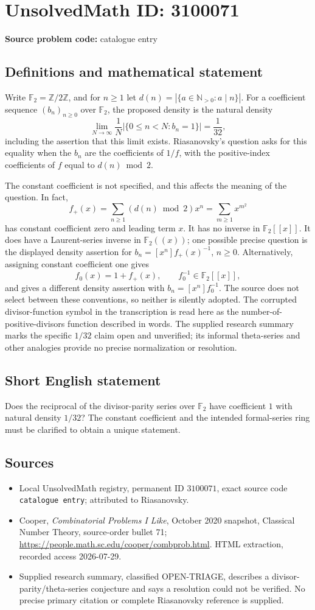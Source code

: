 \documentclass[11pt]{article}
\newcommand{\N}{\mathbb{N}}
\newcommand{\Z}{\mathbb{Z}}
\newcommand{\F}{\mathbb{F}}
\begin{document}
\section*{UnsolvedMath ID: 3100071}
\textbf{Source problem code:} catalogue entry
\subsection{Definitions and mathematical statement}
Write \(\F_2=\Z/2\Z\), and for \(n\ge1\) let \(d(n)=|\{a\in\N_{>0}:a\mid n\}|\). For a coefficient sequence \((b_n)_{n\ge0}\) over \(\F_2\), the proposed density is the natural density
\[
\lim_{N\to\infty}\frac1N|\{0\le n<N:b_n=1\}|=\frac1{32},
\]
including the assertion that this limit exists. Riasanovsky's question asks for this equality when the \(b_n\) are the coefficients of \(1/f\), with the positive-index coefficients of \(f\) equal to \(d(n)\bmod2\).

The constant coefficient is not specified, and this affects the meaning of the question. In fact,
\[
f_+(x)=\sum_{n\ge1}(d(n)\bmod2)x^n=\sum_{m\ge1}x^{m^2}
\]
has constant coefficient zero and leading term \(x\). It has no inverse in \(\F_2[[x]]\). It does have a Laurent-series inverse in \(\F_2((x))\); one possible precise question is the displayed density assertion for \(b_n=[x^n]f_+(x)^{-1}\), \(n\ge0\). Alternatively, assigning constant coefficient one gives
\[
f_0(x)=1+f_+(x),\qquad f_0^{-1}\in\F_2[[x]],
\]
and gives a different density assertion with \(b_n=[x^n]f_0^{-1}\). The source does not select between these conventions, so neither is silently adopted. The corrupted divisor-function symbol in the transcription is read here as the number-of-positive-divisors function described in words. The supplied research summary marks the specific \(1/32\) claim open and unverified; its informal theta-series and other analogies provide no precise normalization or resolution.
\subsection{Short English statement}
Does the reciprocal of the divisor-parity series over \(\F_2\) have coefficient \(1\) with natural density \(1/32\)? The constant coefficient and the intended formal-series ring must be clarified to obtain a unique statement.
\subsection{Sources}
\begin{itemize}
\item Local UnsolvedMath registry, permanent ID \(3100071\), exact source code \texttt{catalogue entry}; attributed to Riasanovsky.
\item Cooper, \emph{Combinatorial Problems I Like}, October 2020 snapshot, Classical Number Theory, source-order bullet 71; \url{https://people.math.sc.edu/cooper/combprob.html}. HTML extraction, recorded access 2026-07-29.
\item Supplied research summary, classified OPEN-TRIAGE, describes a divisor-parity/theta-series conjecture and says a resolution could not be verified. No precise primary citation or complete Riasanovsky reference is supplied.
\end{itemize}
\end{document}
